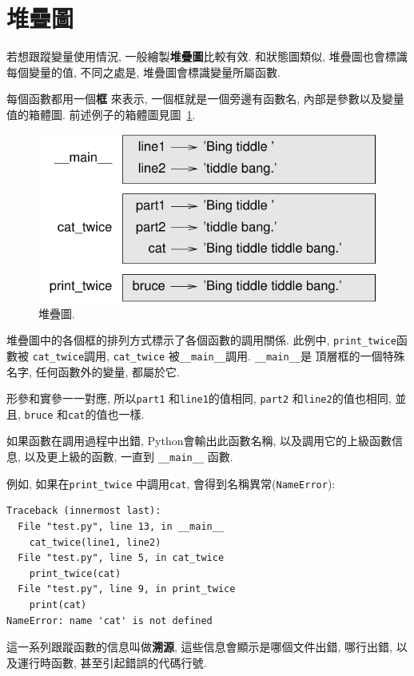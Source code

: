\documentclass[10pt]{book}
\begin{document}
\section{堆疊圖}
\label{stackdiagram}
若想跟蹤變量使用情況, 一般繪製{\bf 堆疊圖}比較有效. 
和狀態圖類似, 堆疊圖也會標識每個變量的值, 不同之處是, 
堆疊圖會標識變量所屬函數. 

每個函數都用一個{\bf 框} 來表示, 一個框就是一個旁邊有函數名, 
內部是參數以及變量值的箱體圖. 
前述例子的箱體圖見圖~\ref{fig.stack}. 

\begin{figure}
\centerline
{\includegraphics[scale=0.8]{figs/stack.pdf}}
\caption{堆疊圖.}
\label{fig.stack}
\end{figure}

堆疊圖中的各個框的排列方式標示了各個函數的調用關係. 
此例中, \verb"print_twice"函數被 \verb"cat_twice"調用, 
\verb"cat_twice" 被\verb"__main__"調用. \verb"__main__"是
頂層框的一個特殊名字, 任何函數外的變量, 都屬於它. 

形參和實參一一對應, 所以{\tt part1} 和{\tt line1}的值相同, 
{\tt part2} 和{\tt line2}的值也相同, 並且, 
 {\tt bruce} 和{\tt cat}的值也一樣. 

如果函數在調用過程中出錯, Python會輸出此函數名稱, 
以及調用它的上級函數信息, 以及更上級的函數, 一直到 \verb"__main__" 函數.

例如, 如果在\verb"print_twice" 中調用{\tt cat}, 會得到名稱異常({\tt NameError}):

\begin{verbatim}
Traceback (innermost last):
  File "test.py", line 13, in __main__
    cat_twice(line1, line2)
  File "test.py", line 5, in cat_twice
    print_twice(cat)
  File "test.py", line 9, in print_twice
    print(cat)
NameError: name 'cat' is not defined
\end{verbatim}
%
這一系列跟蹤函數的信息叫做{\bf 溯源}, 這些信息會顯示是哪個文件出錯, 哪行出錯, 
以及運行時函數, 甚至引起錯誤的代碼行號. 
\end{document}
